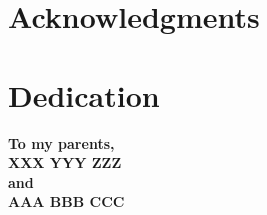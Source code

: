 \clearpage

\section*{Acknowledgments}


\clearpage

\section*{\center Dedication}

\begin{center}
\vspace*{7.0em}
{\bf To my parents,\\
XXX YYY ZZZ\\ and\\ AAA BBB CCC}
\vspace*{\fill}
\end{center}


